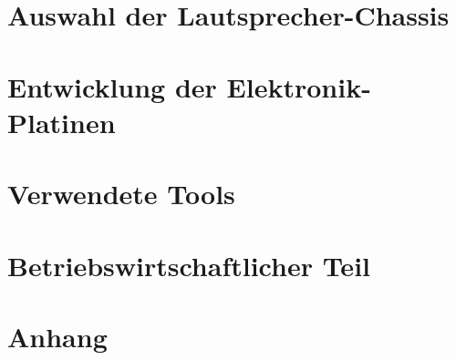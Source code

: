 \documentclass[paper=a4, 12pt, twoside]{scrreprt}
\begin{document}
\chapter{Auswahl der Lautsprecher-Chassis}
%






\chapter{Entwicklung der Elektronik-Platinen}
%


%
%

%
%


\chapter{Verwendete Tools}


\chapter{Betriebswirtschaftlicher Teil}




\chapter{Anhang}



\appendix


\setcounter{lofdepth}{2}
\dipalistoffigures
\end{document}
